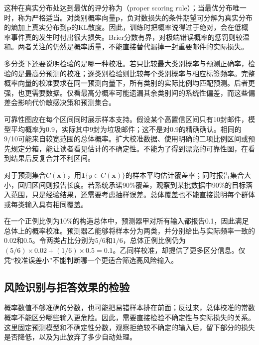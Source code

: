 这种在真实分布处达到最优的评分称为（proper scoring rule）；当最优分布唯一时，称为严格适当。对类别概率向量$\bm p$，负对数损失的条件期望可分解为真实分布的熵加上真实分布到$\bm p$的KL散度。因此，训练时把概率说得过于绝对，会在低概率事件真的发生时付出很大损失。Brier分数有界，对极端错误概率的惩罚则较温和。两者关注的仍然是概率质量，不能直接替代漏掉一封重要邮件的实际损失。

多分类下还要说明检验的是哪一种校准。若只比较最大类别概率与预测正确率，检验的是最高分预测的校准；逐类别检验则比较每个类别概率与相应标签频率。完整概率向量的校准要求在同一预测向量下，所有类别的实际比例均匹配预测。后者更强，也更需要数据。仅看最高分概率可能遗漏其余类别间的系统性偏差，而这些偏差会影响代价敏感决策和预测集合。

可靠性图应在每个区间同时展示样本支持。假设某个高置信区间只有10封邮件，模型平均概率为0.9，实际其中9封为垃圾邮件；这不是对0.9的精确确认。相同的9/10可能来自较宽范围的总体概率。扩大校准数据、使用明确的二项比例区间或预先规定分箱，能让读者看见估计的不确定性。不能为了得到漂亮的可靠性图，在看到结果后反复合并不利区间。

对于预测集合$C(\bm{x})$，用$\mathbf 1\{y\in C(\bm{x})\}$的样本平均估计覆盖率；同时报告集合大小，回归区间则报告长度。若系统承诺90\%覆盖，观察到某批数据中90\%的目标落入范围，只是经验结果，还需要考虑抽样误差。总体覆盖也不能直接说明每个群体或每类输入具有相同覆盖。

\begin{example}[校准与区分能力]
\label{ex:reliability-constant-score}
在一个正例比例为10\%的构造总体中，预测器甲对所有输入都报告0.1，因此满足总体上的概率校准。预测器乙能够将样本分为两类，并分别给出与实际频率一致的0.02和0.5。令两类占比分别为$5/6$和$1/6$，总体正例比例仍为$(5/6)\times0.02+(1/6)\times0.5=0.1$。乙同样校准，却提供了更多区分信息。仅凭“校准误差小”不能判断哪一个更适合筛选高风险输入。
\end{example}

\subsection{风险识别与拒答效果的检验}
\label{sec:reliability-selection-evaluation}

概率数值不够准确的分数，也可能把易错样本排在前面；反过来，总体校准的常数概率不能区分哪些输入更危险。因此，需要直接检验不确定性与实际损失的关系。这里固定预测模型和不确定性分数，观察拒绝较不确定的输入后，留下部分的损失是否降低，以及为此放弃了多少自动处理。

